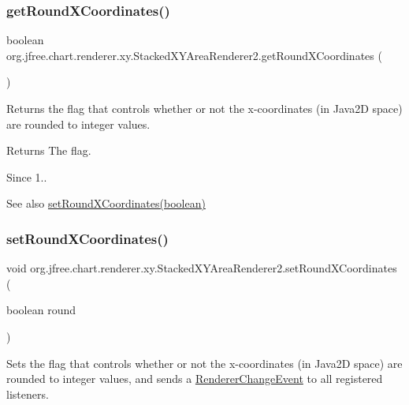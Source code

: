 \subsubsection{\texorpdfstring{get\+Round\+X\+Coordinates()}{getRoundXCoordinates()}}
{\footnotesize\ttfamily boolean org.\+jfree.\+chart.\+renderer.\+xy.\+Stacked\+X\+Y\+Area\+Renderer2.\+get\+Round\+X\+Coordinates (\begin{DoxyParamCaption}{ }\end{DoxyParamCaption})}

Returns the flag that controls whether or not the x-\/coordinates (in Java2D space) are rounded to integer values.

\begin{DoxyReturn}{Returns}
The flag.
\end{DoxyReturn}
\begin{DoxySince}{Since}
1..
\end{DoxySince}
\begin{DoxySeeAlso}{See also}
\mbox{\hyperlink{classorg_1_1jfree_1_1chart_1_1renderer_1_1xy_1_1_stacked_x_y_area_renderer2_a9f673a482a834df86902e80688814c93}{set\+Round\+X\+Coordinates(boolean)}} 
\end{DoxySeeAlso}
\mbox{\label{classorg_1_1jfree_1_1chart_1_1renderer_1_1xy_1_1_stacked_x_y_area_renderer2_a9f673a482a834df86902e80688814c93}} 
\subsubsection{\texorpdfstring{set\+Round\+X\+Coordinates()}{setRoundXCoordinates()}}
{\footnotesize\ttfamily void org.\+jfree.\+chart.\+renderer.\+xy.\+Stacked\+X\+Y\+Area\+Renderer2.\+set\+Round\+X\+Coordinates (\begin{DoxyParamCaption}\item[{boolean}]{round }\end{DoxyParamCaption})}

Sets the flag that controls whether or not the x-\/coordinates (in Java2D space) are rounded to integer values, and sends a \mbox{\hyperlink{}{Renderer\+Change\+Event}} to all registered listeners.



